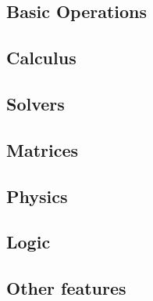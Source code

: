
\subsection{Basic Operations}



\subsection{Calculus}

\subsection{Solvers}

\subsection{Matrices}

\subsection{Physics}

\subsection{Logic}



\subsection{Other features}
